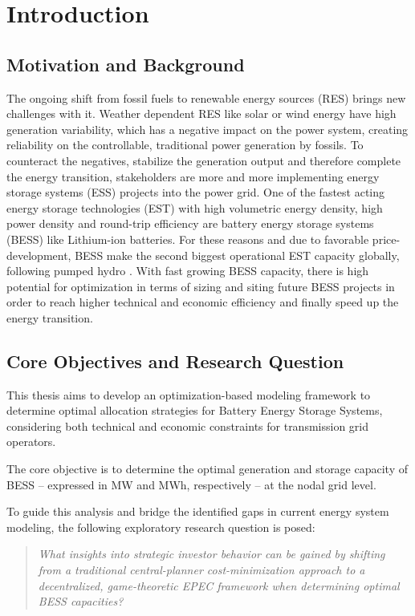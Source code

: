 \chapter{Introduction} \label{ch:introduction}

\section{Motivation and Background}
The ongoing shift from fossil fuels to renewable energy sources (RES) brings new challenges with it. Weather dependent RES like solar or wind energy have high generation variability, which has a negative impact on the power system, creating reliability on the controllable, traditional power generation by fossils. To counteract the negatives, stabilize the generation output and therefore complete the energy transition, stakeholders are more and more implementing energy storage systems (ESS) projects into the power grid. One of the fastest acting energy storage technologies (EST) with high volumetric energy density, high power density and round-trip efficiency are battery energy storage systems (BESS) like Lithium-ion batteries. For these reasons and due to favorable price-development, BESS make the second biggest operational EST capacity globally, following pumped hydro \cite{odero_comprehensive_2022}. With fast growing BESS capacity, there is high potential for optimization in terms of sizing and siting future BESS projects in order to reach higher technical and economic efficiency and finally speed up the energy transition.

\section{Core Objectives and Research Question}
This thesis aims to develop an optimization-based modeling framework to determine optimal allocation strategies for Battery Energy Storage Systems, considering both technical and economic constraints for transmission grid operators.

The core objective is to determine the optimal generation and storage capacity of BESS -- expressed in MW and MWh, respectively -- at the nodal grid level.

To guide this analysis and bridge the identified gaps in current energy system modeling, the following exploratory research question is posed: 
\begin{quote}
\textit{What insights into strategic investor behavior can be gained by shifting from a traditional central-planner cost-minimization approach to a decentralized, game-theoretic EPEC framework when determining optimal BESS capacities?}
\end{quote}

